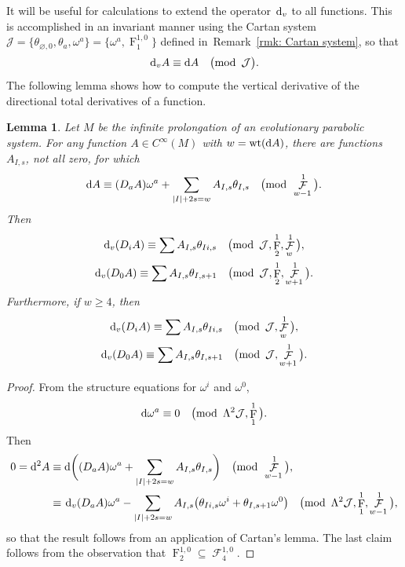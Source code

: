 \documentclass[pdftex]{sigma}
\renewcommand{\d}{{\rm d}}
\renewcommand{\mod}[1]{\quad\big(\mathrm{mod\enspace} #1\big)}
\newcommand{\thetas}[1]{\theta_{#1}}
\newcommand{\thetanot}{\thetas{\varnothing,0}}
\DeclareMathOperator{\pwf}{F}
\DeclareMathOperator{\swf}{\mathcal{F}}
\DeclareMathOperator{\wt}{\mathrm{wt}}
\newcommand{\dv}{\ensuremath{\hspace{1pt} \d_v}}
\newcommand{\cartTheta}{\mathcal{J}}
\newcommand{\cMinfty}{C^\infty(M)}
\numberwithin{equation}{section}
\newtheorem{Lemma}[Theorem]{Lemma}
\begin{document}
It will be useful for calculations to extend the operator $\dv$ to all functions. This is accomplished in an invariant manner using the Cartan system $\cartTheta = \{\thetanot, \thetas{a}, \omega^a\} = \big\{\omega^a, \pwf^{1,0}_1\big\}$ defined in~Remark~\ref{rmk: Cartan system}, so that
\begin{gather*}
\dv A \equiv \d A \mod{\cartTheta} .
\end{gather*}
The following lemma shows how to compute the vertical derivative of the directional total derivatives of a function.
\begin{Lemma}\label{thm:(lem) vertical derivative of directional derivative, sub-principal weights}
 Let $M$ be the infinite prolongation of an evolutionary parabolic system. For any function $A \in \cMinfty$ with $w = \wt(\d A)$, there are functions $A_{I,s}$, not all zero, for which
 \begin{gather*}
 \d A \equiv (D_aA)\omega^a + \sum_{|I|+2s = w} A_{I,s}\thetas{I,s} \mod{\swf^1_{w-1}} .
 \end{gather*}
 Then
 \begin{gather*}
 \dv(D_i A) \equiv \sum A_{I,s}\thetas{Ii,s} \mod{\cartTheta, \pwf^1_2, \swf^1_{w}} ,
 \\
 \dv(D_0 A) \equiv \sum A_{I,s}\thetas{I,s+1} \mod{\cartTheta, \pwf^1_2, \swf^1_{w+1}} .
 \end{gather*}
 Furthermore, if $w \ge 4$, then
 \begin{gather*}
 \dv(D_i A) \equiv \sum A_{I,s}\thetas{Ii,s} \mod{\cartTheta, \swf^1_{w}} ,
 \\
 \dv(D_0 A) \equiv \sum A_{I,s}\thetas{I,s+1} \mod{\cartTheta, \swf^1_{w+1}} .
 \end{gather*}
\end{Lemma}
\begin{proof}
 From the structure equations for $\omega^i$ and $\omega^0$,
 \begin{gather*}
 \d\omega^a \equiv 0 \mod{\Lambda^2\cartTheta, \pwf^1_1} .
 \end{gather*}
 Then
 \begin{align*}
 0 = \d^2 A \equiv{}& \d \bigg((D_a A)\omega^a + \sum_{|I|+2s = w} A_{I,s}\thetas{I,s}\bigg) \mod{\swf^1_{w-1}}, \\
 \equiv{}& \dv (D_a A)\omega^a - \sum_{|I|+2s = w} A_{I,s}\big(\thetas{Ii,s}\omega^i + \thetas{I,s+1}\omega^0\big) \mod{\Lambda^2 \cartTheta, \pwf^1_1, \swf^1_{w-1}} ,
 \end{align*}
 so that the result follows from an application of Cartan's lemma.
 The last claim follows from the observation that $\pwf^{1,0}_2 \subseteq \swf^{1,0}_4$.
\end{proof}
\end{document}

